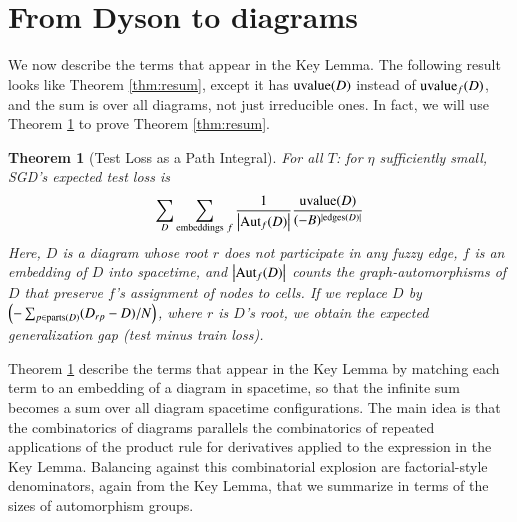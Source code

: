 \documentclass[openany, notitlepage, justified]{tufte-book}
\theoremstyle{plain}
\newtheorem{thm}{Theorem}
\theoremstyle{definition}
\newcommand{\wrap}[1]{\left(#1\right)}
\newcommand{\wabs}[1]{\left|#1\right|}
\newcommand{\Aut}{\text{\textnormal{Aut}}}
\newcommand{\uvalue}{\text{\textnormal{uvalue}}}
\newcommand{\edges}{\text{\textnormal{edges}}}
\newcommand{\parts}{\text{\textnormal{parts}}}
\begin{document}
    \section{From Dyson to diagrams}                             \label{appendix:toward-diagrams}

        We now describe the terms that appear in the Key Lemma.  The following
        result looks like Theorem \ref{thm:resum}, except it has $\uvalue(D)$
        instead of $\uvalue_f(D)$, and the sum is over all diagrams, not just
        irreducible ones.  In fact, we will use Theorem \ref{thm:pathint} to
        prove Theorem \ref{thm:resum}.

        \begin{thm}[Test Loss as a Path Integral] \label{thm:pathint}
            For all $T$: for $\eta$ sufficiently small, SGD's expected test
            loss is
            \begin{equation*}\label{eq:sgdcoef}
                \sum_{D}
                    \sum_{\text{embeddings}~f}
                    \frac{1}{\wabs{\Aut_f(D)}}
                \frac{\uvalue(D)}{(-B)^{|\edges(D)|}}
            \end{equation*}
            Here, $D$ is a diagram whose root $r$ does not participate in
            any fuzzy edge, $f$ is an embedding of $D$ into spacetime, and
            $\wabs{\Aut_f(D)}$ counts the graph-automorphisms of $D$ that
            preserve $f$'s assignment of nodes to cells.
            If we replace $D$ by 
            $
                \wrap{-\sum_{p \in \parts(D)} (D_{rp} - D)/N}
            $, where $r$ is $D$'s root,
            we obtain the expected generalization gap (test minus train loss).
        \end{thm}

        Theorem \ref{thm:pathint} describe the terms that appear in the Key
        Lemma by matching each term to an embedding of a diagram in spacetime,
        so that the infinite sum becomes a sum over all diagram spacetime
        configurations.  The main idea is that the combinatorics of diagrams
        parallels the combinatorics of repeated applications of the product
        rule for derivatives applied to the expression in the Key Lemma.
        Balancing against this combinatorial explosion are factorial-style
        denominators, again from the Key Lemma, that we summarize in terms of
        the sizes of automorphism groups.
\end{document}

